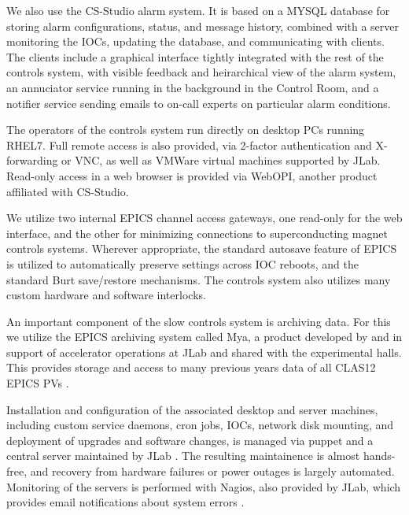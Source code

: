 We also use the CS-Studio alarm system.  It is based on a MYSQL database for storing alarm configurations, status, and message history, combined with a server monitoring the IOCs, updating the database, and communicating with clients.  The clients include a graphical interface tightly integrated with the rest of the controls system, with visible feedback and heirarchical view of the alarm system, an annuciator service running in the background in the Control Room, and a notifier service sending emails to on-call experts on particular alarm conditions.

The operators of the controls system run directly on desktop PCs running RHEL7.  Full remote access is also provided, via 2-factor authentication and X-forwarding or VNC, as well as VMWare virtual machines supported by JLab.  Read-only access in a web browser is provided via WebOPI, another product affiliated with CS-Studio.

We utilize two internal EPICS channel access gateways, one read-only for the web interface, and the other for minimizing connections to superconducting magnet controls systems.  Wherever appropriate, the standard autosave feature of EPICS is utilized to automatically preserve settings across IOC reboots, and the standard Burt save/restore mechanisms.  The controls system also utilizes many custom hardware and software interlocks.

An important component of the slow controls system is archiving data.  For this we utilize the EPICS archiving system called Mya, a product developed by and in support of accelerator operations at JLab and shared with the experimental halls.  This provides storage and access to many previous years data of all CLAS12 EPICS PVs \cite{mya}.

Installation and configuration of the associated desktop and server machines, including custom service daemons, cron jobs, IOCs, network disk mounting, and deployment of upgrades and software changes, is managed via puppet and a central server maintained by JLab \cite{puppet-website}. The resulting maintainence is almost hands-free, and recovery from hardware failures or power outages is largely automated.  Monitoring of the servers is performed with Nagios, also provided by JLab, which provides email notifications about system errors \cite{nagios-website}.

